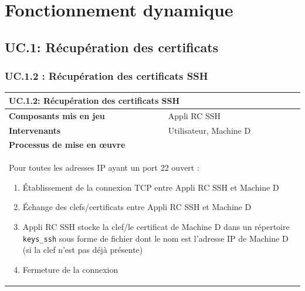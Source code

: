 \documentclass[a4paper,11pt,french]{article}
\begin{document}
\newpage
\section{Fonctionnement dynamique}

\subsection{UC.1: Récupération des certificats}

\subsubsection{UC.1.2 : Récupération des certificats SSH}
\begin{center}
	\begin{tabularx}{16cm}{|l|X|}
	\hline
	\multicolumn{2}{|l|}{\textbf{UC.1.2: Récupération des certificats SSH}}\\
	\hline
	\textbf{Composants mis en jeu} & Appli RC SSH\\
	\hline
	\textbf{Intervenants} & Utilisateur, Machine D\\
	\hline
	\multicolumn{2}{|l|}{\textbf{Processus de mise en \oe uvre}}\\
	\hline
	\multicolumn{2}{|p{15cm}|}{
    Pour toutes les adresses IP ayant un port 22 ouvert :
	\begin{enumerate}
	\item Établissement de la connexion TCP entre Appli RC SSH et Machine D
	\item Échange des clefs/certificats entre Appli RC SSH et Machine D
	\item Appli RC SSH stocke la clef/le certificat de Machine D dans un répertoire \verb+keys_ssh+ sous forme de fichier dont le nom est l'adresse IP de Machine D (si la clef n'est pas déjà présente)
	\item Fermeture de la connexion
	\end{enumerate}
	}\\
	\hline
	\end{tabularx}
\end{center}
\end{document}
